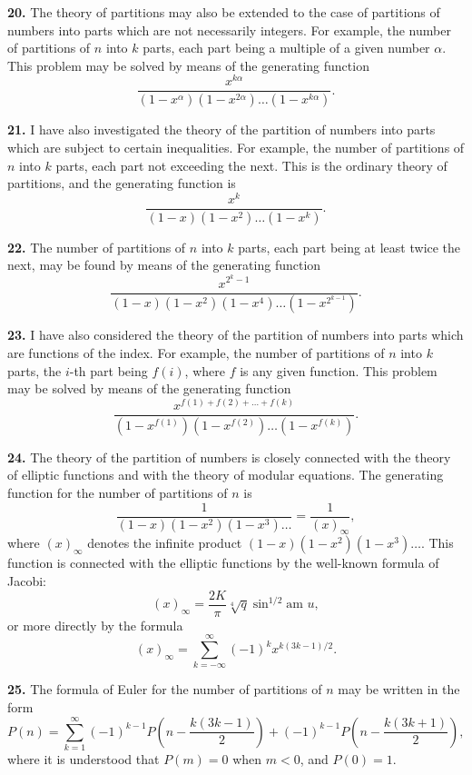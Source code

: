 \documentclass[11pt,a4paper]{book}
\begin{document}
\textbf{20.} The theory of partitions may also be extended to the case of partitions of numbers into parts which are not necessarily integers. For example, the number of partitions of $n$ into $k$ parts, each part being a multiple of a given number $\alpha$. This problem may be solved by means of the generating function
\[
\frac{x^{k\alpha}}{(1-x^{\alpha})(1-x^{2\alpha})\ldots(1-x^{k\alpha})}.
\]

\newpage
\setcounter{page}{242}

\textbf{21.} I have also investigated the theory of the partition of numbers into parts which are subject to certain inequalities. For example, the number of partitions of $n$ into $k$ parts, each part not exceeding the next. This is the ordinary theory of partitions, and the generating function is
\[
\frac{x^k}{(1-x)(1-x^2)\ldots(1-x^k)}.
\]

\textbf{22.} The number of partitions of $n$ into $k$ parts, each part being at least twice the next, may be found by means of the generating function
\[
\frac{x^{2^k-1}}{(1-x)(1-x^2)(1-x^4)\ldots(1-x^{2^{k-1}})}.
\]

\textbf{23.} I have also considered the theory of the partition of numbers into parts which are functions of the index. For example, the number of partitions of $n$ into $k$ parts, the $i$-th part being $f(i)$, where $f$ is any given function. This problem may be solved by means of the generating function
\[
\frac{x^{f(1)+f(2)+\ldots+f(k)}}{(1-x^{f(1)})(1-x^{f(2)})\ldots(1-x^{f(k)})}.
\]

\newpage
\setcounter{page}{243}

\textbf{24.} The theory of the partition of numbers is closely connected with the theory of elliptic functions and with the theory of modular equations. The generating function for the number of partitions of $n$ is
\[
\frac{1}{(1-x)(1-x^2)(1-x^3)\ldots} = \frac{1}{(x)_{\infty}},
\]
where $(x)_{\infty}$ denotes the infinite product $(1-x)(1-x^2)(1-x^3)\ldots$. This function is connected with the elliptic functions by the well-known formula of Jacobi:
\[
(x)_{\infty} = \frac{2K}{\pi} \sqrt[4]{q} \sin^{1/2} \text{am } u,
\]
or more directly by the formula
\[
(x)_{\infty} = \sum_{k=-\infty}^{\infty} (-1)^k x^{k(3k-1)/2}.
\]

\textbf{25.} The formula of Euler for the number of partitions of $n$ may be written in the form
\[
P(n) = \sum_{k=1}^{\infty} (-1)^{k-1} P\left(n - \frac{k(3k-1)}{2}\right) + (-1)^{k-1} P\left(n - \frac{k(3k+1)}{2}\right),
\]
where it is understood that $P(m) = 0$ when $m < 0$, and $P(0) = 1$.
\end{document}
